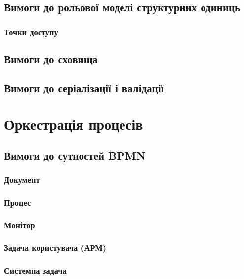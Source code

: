 \subsection{Вимоги до рольової моделі структурних одиниць}

\subsubsection{Точки доступу}

\subsection{Вимоги до сховища}

\subsection{Вимоги до серіалізації і валідації}

\newpage
\section{Оркестрація процесів}

\subsection{Вимоги до сутностей BPMN}

\subsubsection{Документ}

\subsubsection{Процес}

\subsubsection{Монітор}

\subsubsection{Задача користувача (АРМ)}

\subsubsection{Системна задача}

